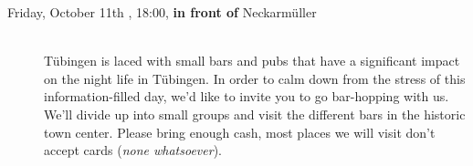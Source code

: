 \begin{description}
%
%
%

\ifml
	\item[Friday, October 11th \YEAR, 18:00, \textbf{in front of} Neckarmüller]\ \\
        Tübingen is laced with small bars and pubs that have a significant impact on the night life in Tübingen. In order to calm down from the stress of this information-filled day, we'd like to invite you to go bar-hopping with us. We'll divide up into small groups and visit the different bars in the historic town center. Please bring enough cash, most places we will visit don't accept cards (\emph{none whatsoever}).


\end{description}
